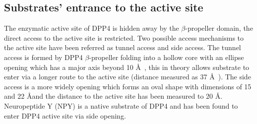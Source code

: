 \subsection{Substrates' entrance to the active site}

The enzymatic active site of DPP4 is hidden away by the $\beta$-propeller domain, the direct access to the active site is restricted. Two possible access mechanisms to the active site have been referred as tunnel access and side access. The tunnel access is formed by DPP4 $\beta$-propeller  folding into a hollow core with an ellipse opening which has a major axis beyond 10 \AA~\cite{Hiramatsu2003}, this in theory allows substrate to enter via a longer route to the active site (distance measured as 37 \AA~\cite{Engel_2003}). The side access is a more widely opening which forms an oval shape with dimensions of 15 and 22 \AA and the distance to the active site has been measured to 20 \AA.~\cite{Engel_2003, Rasmussen_2002,Weihofen_2004} Neuropeptide Y (NPY) is a native substrate of DPP4 and has been found to enter DPP4 active site via side opening. ~\cite{Aertgeerts_2004}